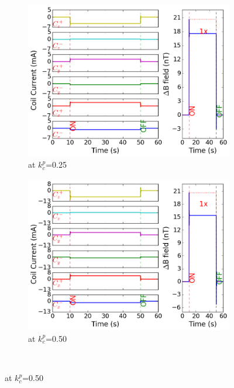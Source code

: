 \begin{figure}[!htb]
    \begin{subfigure}{.5\linewidth}
        \centering
        \includegraphics[width=\linewidth, height= 6.5 cm]{Images/p25_33}
        \caption{at $k_c^p$=0.25}
        \label{fig:p25}
    \end{subfigure}%
    \begin{subfigure}{.5\linewidth}
        \centering
        \includegraphics[width=\linewidth, height= 6.5 cm]{Images/p50_33}
        \caption{at $k_c^p$=0.50}
        \label{fig:p50}
    \end{subfigure}\\[1ex]

\end{figure}

